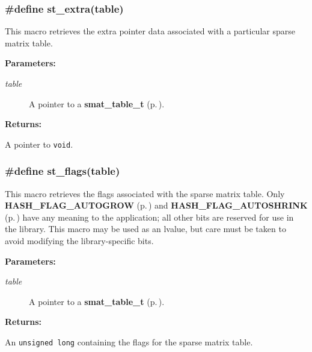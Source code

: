 \subsubsection{\setlength{\rightskip}{0pt plus 5cm}\#define st\_\-extra(table)}\label{group__dbprim__smat_a27}




 This macro retrieves the extra pointer data associated with a particular sparse matrix table.\begin{Desc}
\item[{\bf Parameters: }]\par
\begin{description}
\item[
{\em table}]A pointer to a {\bf smat\_\-table\_\-t} {\rm (p.\,\pageref{group__dbprim__smat_a0})}.

\end{description}
\end{Desc}
\begin{Desc}
\item[{\bf Returns: }]\par
A pointer to {\tt void}. \end{Desc}
\subsubsection{\setlength{\rightskip}{0pt plus 5cm}\#define st\_\-flags(table)}\label{group__dbprim__smat_a23}




 This macro retrieves the flags associated with the sparse matrix table. Only {\bf HASH\_\-FLAG\_\-AUTOGROW} {\rm (p.\,\pageref{group__dbprim__hash_a16})} and {\bf HASH\_\-FLAG\_\-AUTOSHRINK} {\rm (p.\,\pageref{group__dbprim__hash_a17})} have any meaning to the application; all other bits are reserved for use in the library. This macro may be used as an lvalue, but care must be taken to avoid modifying the library-specific bits.\begin{Desc}
\item[{\bf Parameters: }]\par
\begin{description}
\item[
{\em table}]A pointer to a {\bf smat\_\-table\_\-t} {\rm (p.\,\pageref{group__dbprim__smat_a0})}.

\end{description}
\end{Desc}
\begin{Desc}
\item[{\bf Returns: }]\par
An {\tt unsigned long} containing the flags for the sparse matrix table. \end{Desc}
